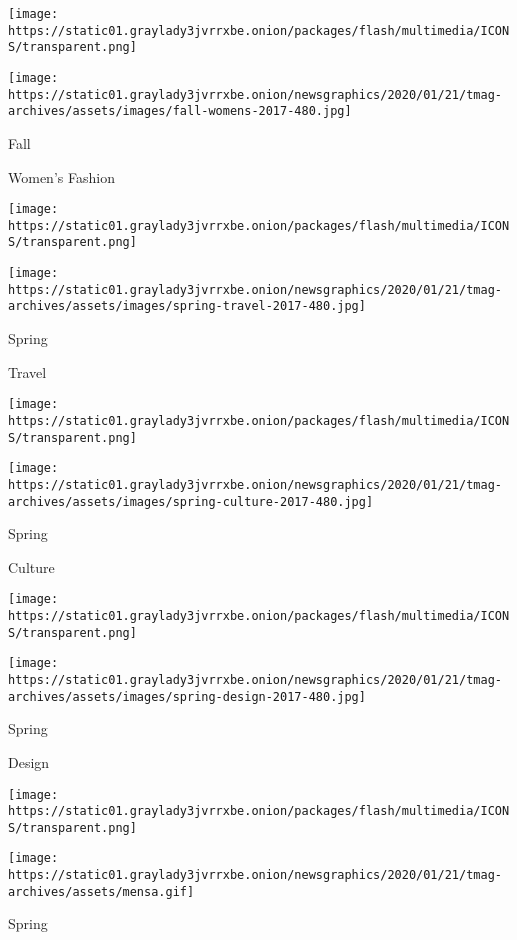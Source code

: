 \texttt{[image: https://static01.graylady3jvrrxbe.onion/packages/flash/multimedia/ICONS/transparent.png]}

\texttt{[image: https://static01.graylady3jvrrxbe.onion/newsgraphics/2020/01/21/tmag-archives/assets/images/fall-womens-2017-480.jpg]}

Fall

Women's Fashion

\href{https://www.nytimes3xbfgragh.onion/issue/t-magazine/2017/05/08/ts-may-21-travel-issue-20170521}{}

\texttt{[image: https://static01.graylady3jvrrxbe.onion/packages/flash/multimedia/ICONS/transparent.png]}

\texttt{[image: https://static01.graylady3jvrrxbe.onion/newsgraphics/2020/01/21/tmag-archives/assets/images/spring-travel-2017-480.jpg]}

Spring

Travel

\href{https://www.nytimes3xbfgragh.onion/issue/t-magazine/2017/04/10/ts-april-23-culture-issue-20170423}{}

\texttt{[image: https://static01.graylady3jvrrxbe.onion/packages/flash/multimedia/ICONS/transparent.png]}

\texttt{[image: https://static01.graylady3jvrrxbe.onion/newsgraphics/2020/01/21/tmag-archives/assets/images/spring-culture-2017-480.jpg]}

Spring

Culture

\href{https://www.nytimes3xbfgragh.onion/issue/t-magazine/2017/03/07/design-issue-20170326}{}

\texttt{[image: https://static01.graylady3jvrrxbe.onion/packages/flash/multimedia/ICONS/transparent.png]}

\texttt{[image: https://static01.graylady3jvrrxbe.onion/newsgraphics/2020/01/21/tmag-archives/assets/images/spring-design-2017-480.jpg]}

Spring

Design

\href{https://www.nytimes3xbfgragh.onion/issue/t-magazine/2017/03/05/ts-march-5-mens-style-issue}{}

\texttt{[image: https://static01.graylady3jvrrxbe.onion/packages/flash/multimedia/ICONS/transparent.png]}

\texttt{[image: https://static01.graylady3jvrrxbe.onion/newsgraphics/2020/01/21/tmag-archives/assets/mensa.gif]}

Spring

